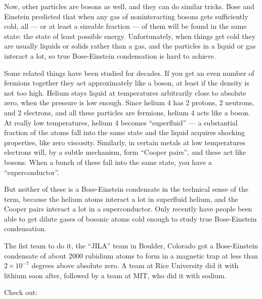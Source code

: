 \documentclass{article}
\renewcommand{\texttt}[1]{%
  \begingroup
  \ttfamily
  \begingroup\lccode`~=`/\lowercase{\endgroup\def~}{/\discretionary{}{}{}}%
  \begingroup\lccode`~=`[\lowercase{\endgroup\def~}{[\discretionary{}{}{}}%
  \begingroup\lccode`~=`.\lowercase{\endgroup\def~}{.\discretionary{}{}{}}%
  \catcode`/=\active\catcode`[=\active\catcode`.=\active
  \scantokens{#1\noexpand}%
  \endgroup
}
\begin{document}
Now, other particles are bosons as well, and they can do similar tricks.
Bose and Einstein predicted that when any gas of noninteracting bosons
gets sufficiently cold, all --- or at least a sizeable fraction --- of
them will be found in the same state: the state of least possible
energy. Unfortunately, when things get cold they are usually liquids or
solids rather than a gas, and the particles in a liquid or gas interact
a lot, so true Bose-Einstein condensation is hard to achieve.

Some related things have been studied for decades. If you get an even
number of fermions together they act approximately like a boson, at
least if the density is not too high. Helium stays liquid at
temperatures arbitrarily close to absolute zero, when the pressure is
low enough. Since helium 4 has 2 protons, 2 neutrons, and 2 electrons,
and all these particles are fermions, helium 4 acts like a boson. At
really low temperatures, helium 4 becomes ``superfluid'' --- a
substantial fraction of the atoms fall into the same state and the
liquid acquires shocking properties, like zero viscosity. Similarly, in
certain metals at low temperatures electrons will, by a subtle
mechanism, form ``Cooper pairs'', and these act like bosons. When a
bunch of these fall into the same state, you have a ``superconductor''.

But neither of these is a Bose-Einstein condensate in the technical
sense of the term, because the helium atoms interact a lot in superfluid
helium, and the Cooper pairs interact a lot in a superconductor. Only
recently have people been able to get dilute gases of bosonic atoms cold
enough to study true Bose-Einstein condensation.

The fist team to do it, the ``JILA'' team in Boulder, Colorado got a
Bose-Einstein condensate of about 2000 rubidium atoms to form in a
magnetic trap at less than \(2 \times 10^{-7}\) degrees above absolute
zero. A team at Rice University did it with lithium soon after, followed
by a team at MIT, who did it with sodium.

Check out:

\end{document}
